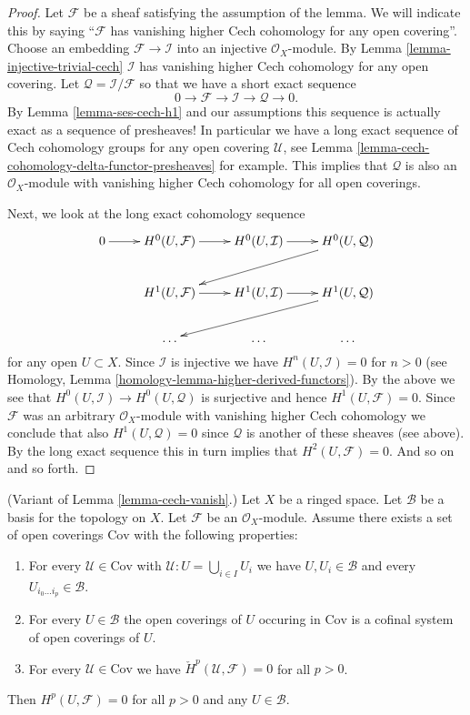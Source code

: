 \begin{proof}
Let $\mathcal{F}$ be a sheaf satisfying the assumption of the lemma.
We will indicate this by saying ``$\mathcal{F}$ has vanishing higher
Cech cohomology for any open covering''.
Choose an embedding $\mathcal{F} \to \mathcal{I}$ into an
injective $\mathcal{O}_X$-module.
By Lemma \ref{lemma-injective-trivial-cech} $\mathcal{I}$ has vanishing higher
Cech cohomology for any open covering.
Let $\mathcal{Q} = \mathcal{I}/\mathcal{F}$
so that we have a short exact sequence
$$
0 \to \mathcal{F} \to \mathcal{I} \to \mathcal{Q} \to 0.
$$
By Lemma \ref{lemma-ses-cech-h1} and our assumptions
this sequence is actually exact as a sequence of presheaves!
In particular we have a long exact sequence of Cech cohomology
groups for any open covering $\mathcal{U}$, see
Lemma \ref{lemma-cech-cohomology-delta-functor-presheaves}
for example. This implies that $\mathcal{Q}$ is also an $\mathcal{O}_X$-module
with vanishing higher Cech cohomology for all open coverings.

\medskip\noindent
Next, we look at the long exact cohomology sequence
$$
\xymatrix{
0 \ar[r] &
H^0(U, \mathcal{F}) \ar[r] &
H^0(U, \mathcal{I}) \ar[r] &
H^0(U, \mathcal{Q}) \ar[lld] \\
&
H^1(U, \mathcal{F}) \ar[r] &
H^1(U, \mathcal{I}) \ar[r] &
H^1(U, \mathcal{Q}) \ar[lld] \\
&
\ldots & \ldots & \dots \\
}
$$
for any open $U \subset X$. Since $\mathcal{I}$ is injective we
have $H^n(U, \mathcal{I}) = 0$ for $n > 0$ (see
Homology, Lemma \ref{homology-lemma-higher-derived-functors}).
By the above we see that $H^0(U, \mathcal{I}) \to H^0(U, \mathcal{Q})$
is surjective and hence $H^1(U, \mathcal{F}) = 0$.
Since $\mathcal{F}$ was an arbitrary $\mathcal{O}_X$-module with
vanishing higher Cech cohomology we conclude that also
$H^1(U, \mathcal{Q}) = 0$ since $\mathcal{Q}$ is another of these
sheaves (see above). By the long exact sequence this in turn implies
that $H^2(U, \mathcal{F}) = 0$. And so on and so forth.
\end{proof}

\begin{lemma}
\label{lemma-cech-vanish-basis}
(Variant of Lemma \ref{lemma-cech-vanish}.)
Let $X$ be a ringed space.
Let $\mathcal{B}$ be a basis for the topology on $X$.
Let $\mathcal{F}$ be an $\mathcal{O}_X$-module.
Assume there exists a set of open coverings $\text{Cov}$
with the following properties:
\begin{enumerate}
\item For every $\mathcal{U} \in \text{Cov}$
with $\mathcal{U} : U = \bigcup_{i \in I} U_i$ we have
$U, U_i \in \mathcal{B}$ and every $U_{i_0 \ldots i_p} \in \mathcal{B}$.
\item For every $U \in \mathcal{B}$ the open coverings of $U$
occuring in $\text{Cov}$ is a cofinal system of open coverings
of $U$.
\item For every $\mathcal{U} \in \text{Cov}$ we have
$\check{H}^p(\mathcal{U}, \mathcal{F}) = 0$ for all $p > 0$.
\end{enumerate}
Then $H^p(U, \mathcal{F}) = 0$ for all $p > 0$ and any $U \in \mathcal{B}$.
\end{lemma}

